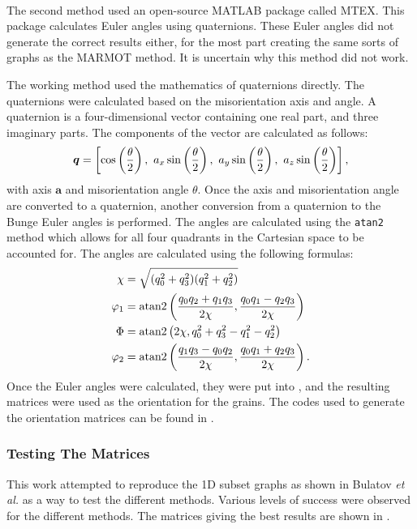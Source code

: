 \documentclass[twoside,senior]{BYUPhys}
\begin{document}
The second method used an open-source MATLAB\textsuperscript{\textregistered} package called MTEX.\cite{bachmann2010}  This package calculates Euler angles using quaternions.  These Euler angles did not generate the correct results either, for the most part creating the same sorts of graphs as the MARMOT method.  It is uncertain why this method did not work.

The working method used the mathematics of quaternions directly.\cite{weisstein2004}  The quaternions were calculated based on the misorientation axis and angle.  A quaternion is a four-dimensional vector containing one real part, and three imaginary parts.  The components of the vector are calculated as follows:
\begin{equation}
\label{eq:quat}
\bm{q}=\left[\textnormal{cos}\left(\frac{\theta}{2}\right),\ a_x\,\textnormal{sin}\left(\frac{\theta}{2}\right),\ a_y\,\textnormal{sin}\left(\frac{\theta}{2}\right),\ a_z\,\textnormal{sin}\left(\frac{\theta}{2}\right)\right],
\end{equation}
with axis $\bm{a}$ and misorientation angle $\theta$.  Once the axis and misorientation angle are converted to a quaternion, another conversion from a quaternion to the Bunge Euler angles is performed.  The angles are calculated using the \lstinline!atan2! method which allows for all four quadrants in the Cartesian space to be accounted for.  The angles are calculated using the following formulas:
\begin{align}
\label{eq:quat2euler}
\begin{aligned}
\chi &= \sqrt{(q_0^2+q_3^2)(q_1^2+q_2^2)}\\
\varphi_1 &= \textnormal{atan2}\left(\frac{q_0q_2+q_1q_3}{2\chi}, \frac{q_0q_1-q_2q_3}{2\chi}\right)\\
\Phi &= \textnormal{atan2}\left(2\chi, q_0^2+q_3^2-q_1^2-q_2^2\right)\\
\varphi_2 &= \textnormal{atan2}\left(\frac{q_1q_3-q_0q_2}{2\chi}, \frac{q_0q_1+q_2q_3}{2\chi}\right).
\end{aligned}
\end{align}
Once the Euler angles were calculated, they were put into , and the resulting matrices were used as the orientation for the grains.  The codes used to generate the orientation matrices can be found in .

\subsubsection{Testing The Matrices\label{PQ:Testing}}
This work attempted to reproduce the 1D subset graphs as shown in Bulatov \emph{et al.} as a way to test the different methods.  Various levels of success were observed for the different methods.  The matrices giving the best results are shown in .
\end{document}
